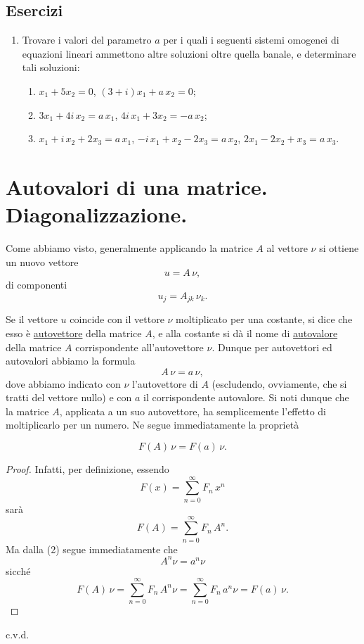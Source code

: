 \documentclass[11pt, a4paper]{book}
\numberwithin{equation}{section}
\newenvironment{esercizi}{\subsection*{Esercizi}\begin{enumerate}}{\end{enumerate}}
\begin{document}
\begin{esercizi}
\item Trovare i valori del parametro $a$ per i quali i seguenti sistemi
omogenei di equazioni lineari ammettono altre soluzioni oltre quella
banale, e determinare tali soluzioni:
\begin{enumerate}
  \item $x_1 + 5x_2 = 0$, \quad $(3+i)x_1 + a\,x_2 = 0$;
  \item $3x_1 + 4i\,x_2 = a\,x_1$, \quad $4i\,x_1 + 3x_2 = -a\,x_2$;
  \item $x_1 + i\,x_2 + 2x_3 = a\,x_1$, \quad
        $-i\,x_1 + x_2 - 2x_3 = a\,x_2$, \quad
        $2x_1 - 2x_2 + x_3 = a\,x_3$.
\end{enumerate}

\end{esercizi}

\section{Autovalori di una matrice. Diagonalizzazione.}

Come abbiamo visto, generalmente applicando la matrice $A$ al vettore $\nu$
si ottiene un nuovo vettore
\begin{equation}
u = A\,\nu,
\end{equation}
di componenti
\begin{equation}
u_j = A_{jk}\,\nu_k.
\end{equation}

Se il vettore $u$ coincide con il vettore $\nu$ moltiplicato per una
costante, si dice che esso è \underline{autovettore} della matrice $A$, e
alla costante si dà il nome di \underline{autovalore} della matrice $A$
corrispondente all'autovettore $\nu$. Dunque per autovettori ed autovalori
abbiamo la formula
\begin{equation}
A\,\nu = a\,\nu,
\end{equation}
dove abbiamo indicato con $\nu$ l'autovettore di $A$ (escludendo,
ovviamente, che si tratti del vettore nullo) e con $a$ il corrispondente
autovalore. Si noti dunque che la matrice $A$, applicata a un suo
autovettore, ha semplicemente l'effetto di moltiplicarlo per un numero. Ne
segue immediatamente la proprietà


\begin{equation}
F(A)\,\nu = F(a)\,\nu.
\end{equation}

\begin{proof}
Infatti, per definizione, essendo
\[
F(x) = \sum_{n=0}^{\infty} F_n\, x^n
\]
sarà
\[
F(A) = \sum_{n=0}^{\infty} F_n\, A^n.
\]
Ma dalla (2) segue immediatamente che
\[
A^n \nu = a^n \nu
\]
sicché
\[
F(A)\,\nu = \sum_{n=0}^{\infty} F_n\, A^n \nu
           = \sum_{n=0}^{\infty} F_n\, a^n \nu
           = F(a)\,\nu.
\]
\end{proof}
\noindent c.v.d.
\end{document}
